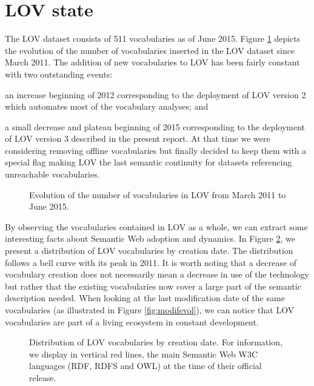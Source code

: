 \documentclass{iosart2c}
\begin{document}
\section{LOV state}\label{sec:state}
The LOV dataset consists of 511 vocabularies as of June 2015. Figure \ref{fig:evolLOV} depicts the evolution of the number of vocabularies inserted in the LOV dataset since March 2011. The addition of new vocabularies to LOV has been fairly constant with two outstanding events: 
\begin{inparaenum}[1)] 
	\item an increase beginning of 2012 corresponding to the deployment of LOV version 2 which automates most of the vocabulary analyses; and
	\item a small decrease and plateau beginning of 2015 corresponding to the deployment of LOV version 3 described in the present report. At that time we were considering  removing offline vocabularies but finally decided to keep them with a special flag making LOV the last semantic continuity for datasets referencing unreachable vocabularies.
\end{inparaenum} 

\begin{figure}[htb]
   \resizebox{1.04\linewidth}{!}{}
   \caption{\label{fig:evolLOV} Evolution of the number of vocabularies in LOV from March 2011 to June 2015.}
\end{figure}



By observing the vocabularies contained in LOV as a whole, we can extract some interesting facts about Semantic Web adoption and dynamics. In Figure \ref{fig:creaevol}, we present a distribution of LOV vocabularies by creation date. The distribution follows a bell curve with its peak in 2011. It is worth noting that a decrease of vocabulary creation does not necessarily mean a decrease in use of the technology but rather that the existing vocabularies now cover a large part of the semantic description needed. When looking at the last modification date of the same vocabularies (as illustrated in Figure \ref{fig:modifevol}), we can notice that LOV vocabularies are part of a living ecosystem in constant development. 

\begin{figure}[htb]
\resizebox{\linewidth}{!}{}
\caption{\label{fig:creaevol} Distribution of LOV vocabularies by creation date. For information, we display in vertical red lines, the main Semantic Web W3C languages (RDF, RDFS and OWL) at the time of their official release.}
\end{figure}
\end{document}
